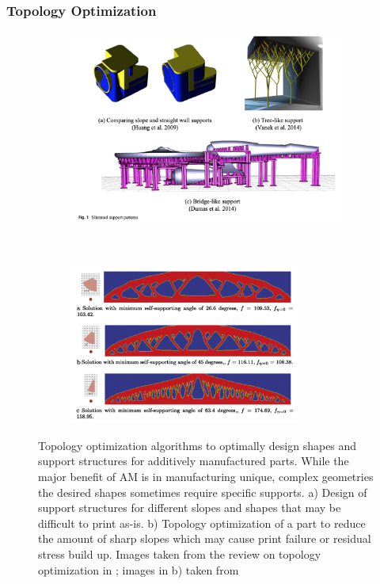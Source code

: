 
\subsubsection{Topology Optimization} \label{sec:topology optimization}
\begin{figure}
	\centering
	\begin{subfigure}{1\textwidth}
		\includegraphics[width=5in]{Images/topopt1}
		\label{topopt1}
	\end{subfigure}
	~
	\centering
	\begin{subfigure}[b]{1\textwidth}
		\includegraphics[width=3in]{Images/topopt2}
		\label{topopt2}
	\end{subfigure}
	\caption{Topology optimization algorithms to optimally design shapes and support structures for additively manufactured parts. While the major benefit of AM is in manufacturing unique, complex geometries the desired shapes sometimes require specific supports. a) Design of support structures for different slopes and shapes that may be difficult to print as-is. b) Topology optimization of a part to reduce the amount of sharp slopes which may cause print failure or residual stress build up. Images taken from the review on topology optimization in \cite{Liu2018}; images in b) taken from \cite{Huang2009, Vanek2014, Dumas2014}}
	\label{topopt}
\end{figure}

